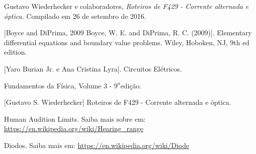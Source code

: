 \documentclass[11pt,a4paper]{article}
\begin{document}
\begin{thebibliography}{10}
    
    Gustavo Wiederhecker e colaboradores, \textsl{Roteiros de F429 - Corrente alternada e óptica.} Compilado em 26 de setembro de 2016.
    
    [Boyce and DiPrima, 2009 Boyce, W. E. and DiPrima, R. C. (2009)]. Elementary differential equations and boundary value problems. Wiley, Hoboken, NJ, 9th ed edition.
    
    [Yaro Burian Jr. e Ana Cristina Lyra]. Circuitos Elétricos.
    
    Fundamentos da Física, Volume 3 - $9^a$edição.
    
    [Gustavo S. Wiederhecker] Roteiros de F429 - Corrente alternada e óptica. 
    
     Human Audition Limits. Saiba mais sobre em:
    \url{https://en.wikipedia.org/wiki/Hearing_range}
    
     Diodos. Saiba mais em: \url{https://en.wikipedia.org/wiki/Diode}

\end{thebibliography}
\end{document}
